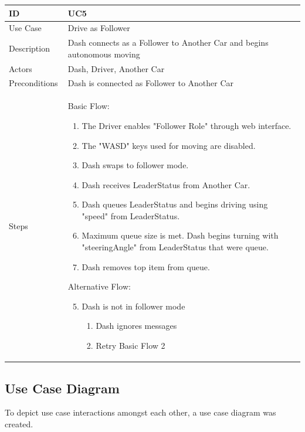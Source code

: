 \documentclass[12pt]{article}
\begin{document}
\begin{longtable}{| p{0.2\linewidth} | p{0.8\linewidth} |}\hline 
    ID & UC5\\ \hline
    Use Case & Drive as Follower \\ \hline
    Description & Dash connects as a Follower to Another Car and begins autonomous moving\\ \hline
    Actors & Dash, Driver, Another Car\\ \hline
    Preconditions & Dash is connected as Follower to Another Car\\ \hline
    Steps & Basic Flow: \begin{enumerate} %
        \itemsep 0em %
    	\item The Driver enables "Follower Role" through web interface.
        \item The "WASD" keys used for moving are disabled.
        \item Dash swaps to follower mode.
        \item Dash receives LeaderStatus from Another Car.
        \item Dash queues LeaderStatus and begins driving using "speed" from LeaderStatus.
        \item Maximum queue size is met. Dash begins turning with "steeringAngle" from LeaderStatus that were queue.
        \item Dash removes top item from queue.
	\end{enumerate}
    Alternative Flow: \begin{enumerate}
        	\setcounter{enumi}{4} %
        	\item Dash is not in follower mode
            \begin{enumerate} %
            	\itemsep 0em %
         		\item Dash ignores messages
                \item Retry Basic Flow 2
       		\end{enumerate}
       	\end{enumerate}\\ \hline
\end{longtable}

\subsection{Use Case Diagram}
To depict use case interactions amongst each other, a use case diagram was created.
\end{document}
